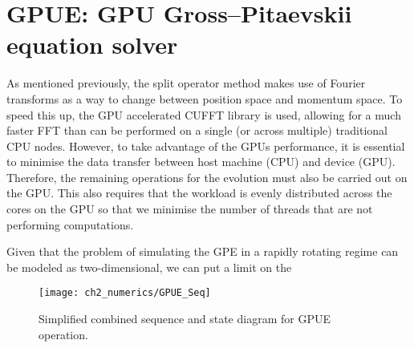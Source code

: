 \section{GPUE: GPU Gross--Pitaevskii equation solver}

As mentioned previously, the split operator method makes use of Fourier transforms as a way to change between position space and momentum space. To speed this up, the GPU accelerated CUFFT library is used, allowing for a much faster FFT than can be performed on a single (or across multiple) traditional CPU nodes. However, to take advantage of the GPUs performance, it is essential to minimise the data transfer between host machine (CPU) and device (GPU). Therefore, the remaining operations for the evolution must also be carried out on the GPU. This also requires that the workload is evenly distributed across the cores on the GPU so that we minimise the number of threads that are not performing computations.

Given that the problem of simulating the GPE in a rapidly rotating regime can be modeled as two-dimensional, we can put a limit on the


\begin{figure}
    \centering
    \texttt{[image: ch2\_numerics/GPUE\_Seq]}
    \caption{Simplified combined sequence and state diagram for GPUE operation.}
    \label{fig:gpue_seq}
\end{figure}
